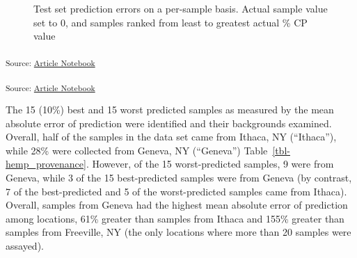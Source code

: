 \documentclass[
]{agujournal2019}
\begin{document}
\label{cell-fig-validation_set_performance}
\begin{figure}[H]


\caption{\label{fig-validation_set_performance}Test set prediction
errors on a per-sample basis. Actual sample value set to 0, and samples
ranked from least to greatest actual \% CP value}

\end{figure}%

\textsubscript{Source:
\href{https://rvcrawford.github.io/glowing-system/index.qmd.html}{Article
Notebook}}

\textsubscript{Source:
\href{https://rvcrawford.github.io/glowing-system/index.qmd.html}{Article
Notebook}}

The 15 (10\%) best and 15 worst predicted samples as measured by the
mean absolute error of prediction were identified and their backgrounds
examined. Overall, half of the samples in the data set came from Ithaca,
NY (``Ithaca''), while 28\% were collected from Geneva, NY (``Geneva'')
Table~\ref{tbl-hemp_provenance}. However, of the 15 worst-predicted
samples, 9 were from Geneva, while 3 of the 15 best-predicted samples
were from Geneva (by contrast, 7 of the best-predicted and 5 of the
worst-predicted samples came from Ithaca). Overall, samples from Geneva
had the highest mean absolute error of prediction among locations, 61\%
greater than samples from Ithaca and 155\% greater than samples from
Freeville, NY (the only locations where more than 20 samples were
assayed).
\end{document}
